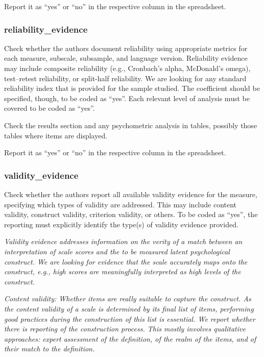 {Report it as ``yes'' or ``no'' in the respective column in the spreadsheet.

\subsubsection*{reliability\_evidence}
\label{relievidence}
Check whether the authors document reliability using appropriate metrics for each measure, subscale, subsample, and language version. Reliability evidence may include composite reliability (e.g., Cronbach’s alpha, McDonald’s omega), test–retest reliability, or split-half reliability. We are looking for any standard reliability index that is provided for the sample studied. The coefficient should be specified, though, to be coded as ``yes''. Each relevant level of analysis must be covered to be coded as ``yes''.

Check the results section and any psychometric analysis in tables, possibly those tables where items are displayed.

Report it as ``yes'' or ``no'' in the respective column in the spreadsheet.

\subsubsection*{validity\_evidence}
\label{validevidence}
Check whether the authors report all available validity evidence for the measure, specifying which types of validity are addressed. This may include content validity, construct validity, criterion validity, or others. To be coded as ``yes'', the reporting must explicitly identify the type(s) of validity evidence provided. 

\textit{Validity evidence addresses information on the verity of a match between an interpretation of scale scores and the to be measured latent psychological construct. We are looking for evidence that the scale accurately maps onto the construct, e.g., high scores are meaningfully interpreted as high levels of the construct.}

\textit{Content validity: Whether items are really suitable to capture the construct. As the content validity of a scale is determined by its final list of items, performing good practices during the construction of this list is essential. We report whether there is reporting of the construction process. This mostly involves qualitative approaches: expert assessment of the definition, of the realm of the items, and of their match to the definition. }

}
